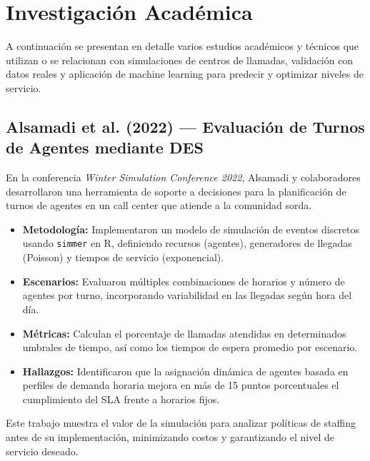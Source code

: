\documentclass[12pt]{article}
\begin{document}
\newpage
\section{Investigación Académica}

A continuación se presentan en detalle varios estudios académicos y técnicos que utilizan o se relacionan con simulaciones de centros de llamadas, validación con datos reales y aplicación de machine learning para predecir y optimizar niveles de servicio.

\subsection{Alsamadi et al. (2022) — Evaluación de Turnos de Agentes mediante DES}
En la conferencia \emph{Winter Simulation Conference 2022}, Alsamadi y colaboradores desarrollaron una herramienta de soporte a decisiones para la planificación de turnos de agentes en un call center que atiende a la comunidad sorda.  
\begin{itemize}
  \item \textbf{Metodología:} Implementaron un modelo de simulación de eventos discretos usando \texttt{simmer} en R, definiendo recursos (agentes), generadores de llegadas (Poisson) y tiempos de servicio (exponencial).  
  \item \textbf{Escenarios:} Evaluaron múltiples combinaciones de horarios y número de agentes por turno, incorporando variabilidad en las llegadas según hora del día.  
  \item \textbf{Métricas:} Calculan el porcentaje de llamadas atendidas en determinados umbrales de tiempo, así como los tiempos de espera promedio por escenario.  
  \item \textbf{Hallazgos:} Identificaron que la asignación dinámica de agentes basada en perfiles de demanda horaria mejora en más de 15 puntos porcentuales el cumplimiento del SLA frente a horarios fijos.  
\end{itemize}
Este trabajo muestra el valor de la simulación para analizar políticas de staffing antes de su implementación, minimizando costos y garantizando el nivel de servicio deseado.
\end{document}
